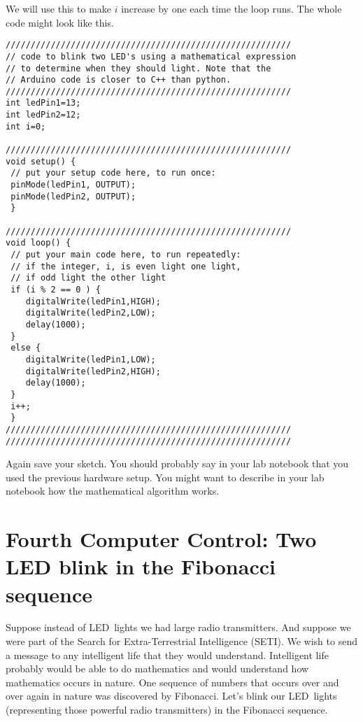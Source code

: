 We will use this to make $i$ increase by one each time the loop runs. The
whole code might look like this.
 \begin{lstlisting}[language=Arduino]
/////////////////////////////////////////////////////////
// code to blink two LED's using a mathematical expression
// to determine when they should light. Note that the 
// Arduino code is closer to C++ than python.
/////////////////////////////////////////////////////////
int ledPin1=13;
int ledPin2=12;
int i=0;
 
/////////////////////////////////////////////////////////
void setup() {
 // put your setup code here, to run once:
 pinMode(ledPin1, OUTPUT);
 pinMode(ledPin2, OUTPUT);
 }
 
/////////////////////////////////////////////////////////
void loop() {
 // put your main code here, to run repeatedly:
 // if the integer, i, is even light one light, 
 // if odd light the other light
 if (i % 2 == 0 ) {
    digitalWrite(ledPin1,HIGH);
    digitalWrite(ledPin2,LOW);
    delay(1000);
 }
 else {
    digitalWrite(ledPin1,LOW);
    digitalWrite(ledPin2,HIGH);
    delay(1000);
 }
 i++;
 }
/////////////////////////////////////////////////////////
/////////////////////////////////////////////////////////
 \end{lstlisting}

Again save your sketch. You should probably say in your lab notebook that
you used the previous hardware setup. You might want to describe in your lab
notebook how the mathematical algorithm works.

\section{Fourth Computer Control: Two LED blink in the Fibonacci sequence}

Suppose instead of LED\ lights we had large radio transmitters. And suppose
we were part of the Search for Extra-Terrestrial Intelligence (SETI). We
wish to send a message to any intelligent life that they would understand.
Intelligent life probably would be able to do mathematics and would
understand how mathematics occurs in nature. One sequence of numbers that
occurs over and over again in nature was discovered by Fibonacci. Let's
blink our LED\ lights (representing those powerful radio transmitters) in
the Fibonacci sequence.

